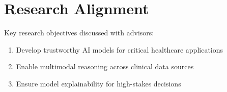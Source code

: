 \section{Research Alignment}
Key research objectives discussed with advisors:
\begin{enumerate}
    \item Develop trustworthy AI models for critical healthcare applications
    \item Enable multimodal reasoning across clinical data sources
    \item Ensure model explainability for high-stakes decisions
\end{enumerate}

